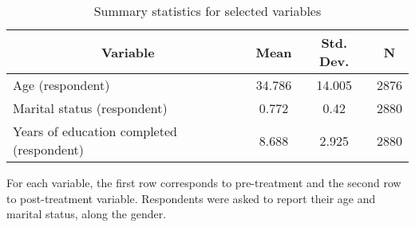 \documentclass[11pt]{article}
\begin{document}
    \begin{table}[h]\centering \caption{Summary statistics for selected variables  \label{sumstat}}
    	\begin{tabular}{l c c  c}\hline\hline
    		\multicolumn{1}{c}{\textbf{Variable}} & \textbf{Mean}
    		& \textbf{Std. Dev.} & \textbf{N}\\ \hline
    		Age (respondent) & 34.786 & 14.005  & 2876\\
    		Marital status (respondent) & 0.772 & 0.42  & 2880\\
    		Years of education completed (respondent) & 8.688 & 2.925  & 2880\\
    			\hline
    	\end{tabular}
    \end{table}
For each variable, the first row corresponds to pre-treatment and the second row to post-treatment variable. Respondents were asked to report their age and marital status, along the gender.
\pagebreak
\end{document}
